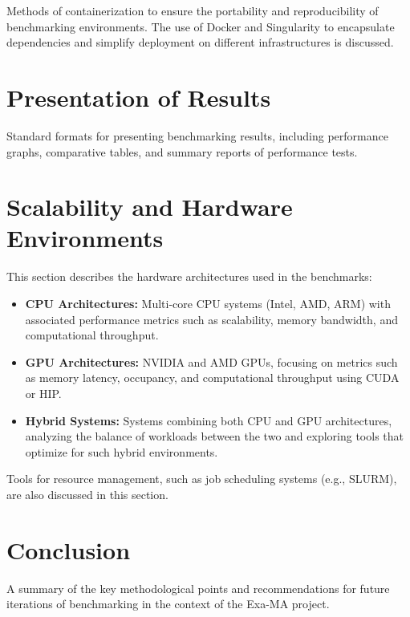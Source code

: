 Methods of containerization to ensure the portability and reproducibility of benchmarking environments.
The use of Docker and Singularity to encapsulate dependencies and simplify deployment on different infrastructures is discussed.

\section{Presentation of Results}
\label{sec:methodology-presentation}
Standard formats for presenting benchmarking results, including performance graphs, comparative tables, and summary reports of performance tests.

\section{Scalability and Hardware Environments}
\label{sec:methodology-environments}

This section describes the hardware architectures used in the benchmarks:
\begin{itemize}
    \item \textbf{CPU Architectures:} Multi-core CPU systems (Intel, AMD, ARM) with associated performance metrics such as scalability, memory bandwidth, and computational throughput.
    \item \textbf{GPU Architectures:} NVIDIA and AMD GPUs, focusing on metrics such as memory latency, occupancy, and computational throughput using CUDA or HIP.
    \item \textbf{Hybrid Systems:} Systems combining both CPU and GPU architectures, analyzing the balance of workloads between the two and exploring tools that optimize for such hybrid environments.
\end{itemize}
Tools for resource management, such as job scheduling systems (e.g., SLURM), are also discussed in this section.

\section{Conclusion}
\label{sec:methodology-conclusion}

A summary of the key methodological points and recommendations for future iterations of benchmarking in the context of the Exa-MA project.